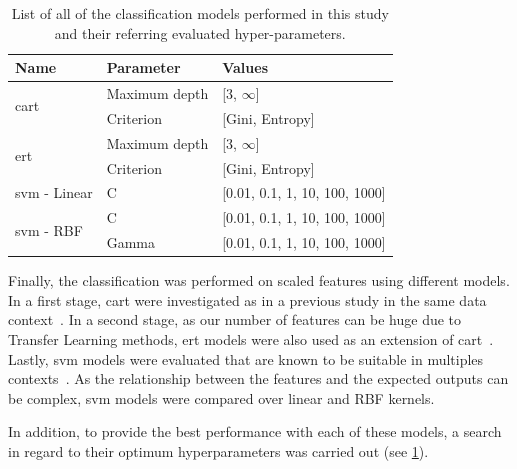 \documentclass[journal,article,submit,moreauthors,pdftex, applsci]{Definitions/mdpi}
\begin{document}
\begin{table}[H]
    \centering
    \begin{tabular}{lll}
    \textbf{Name}                   & \textbf{Parameter}& \textbf{Values}               \\ \hline
    \multirow{2}{*}{\ac{cart}}      & Maximum depth     & [3, $\infty$]                 \\ \cline{2-3}
                                    & Criterion         & [Gini, Entropy]               \\ \hline 
    \multirow{2}{*}{\ac{ert}}       & Maximum depth     & [3, $\infty$]                 \\ \cline{2-3}
                                    & Criterion         & [Gini, Entropy]               \\ \hline 
    \ac{svm} - Linear               & C                 & [0.01, 0.1, 1, 10, 100, 1000] \\ \hline
    \multirow{2}{*}{\ac{svm} - RBF} & C                 & [0.01, 0.1, 1, 10, 100, 1000] \\ \cline{2-3}
                                    & Gamma             & [0.01, 0.1, 1, 10, 100, 1000] \\ \hline 
    \end{tabular}    
    \caption{List of all of the classification models performed in this study and their referring evaluated hyper-parameters.}
    \label{tab:image_hyperparameters}
\end{table}\par
Finally, the classification was performed on scaled features using different models. In a first stage, \ac{cart} were investigated as in a previous study in the same data context~\cite{Wiltgen2008}. In a second stage, as our number of features can be huge due to Transfer Learning methods, \ac{ert} models were also used as an extension of \ac{cart}~\cite{Geurts2006}. Lastly, \ac{svm} models were evaluated that are known to be suitable in multiples contexts~\cite{Smach2008a,Kose2016b}. As the relationship between the features and the expected outputs can be complex, \ac{svm} models were compared over linear and RBF kernels.\par
In addition, to provide the best performance with each of these models, a search in regard to their optimum hyperparameters was carried out (see \cref{tab:image_hyperparameters}).\par

\end{document}
